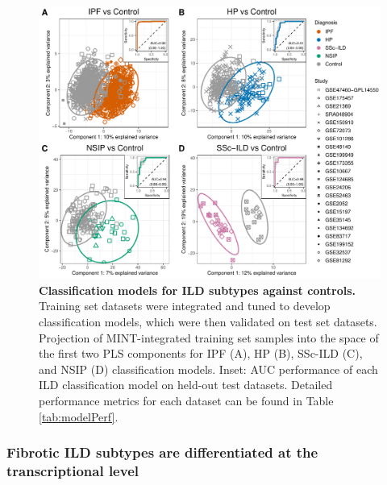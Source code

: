 \documentclass[
]{article}
\begin{document}
\begin{figure}

{\centering \includegraphics[width=1\linewidth,]{./Figures/SysReview/Figure3_MINT} 

}

\caption[ILD classification models]{\textbf{Classification models for ILD subtypes against controls.} Training set datasets were integrated and tuned to develop classification models, which were then validated on test set datasets. Projection of MINT-integrated training set samples into the space of the first two PLS components for IPF (A), HP (B), SSc-ILD (C), and NSIP (D) classification models. Inset: AUC performance of each ILD classification model on held-out test datasets. Detailed performance metrics for each dataset can be found in Table \ref{tab:modelPerf}.}\label{fig:mintmodel}
\end{figure}

\subsubsection{Fibrotic ILD subtypes are differentiated at the transcriptional level}\label{fibrotic-ild-subtypes-are-differentiated-at-the-transcriptional-level}
\end{document}

